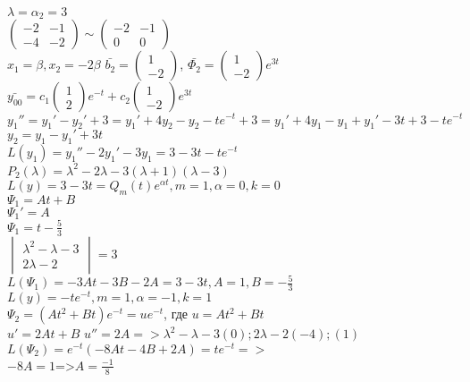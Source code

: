 \begin{Example}[алгебраическая]
$\lambda=\alpha_2=3$\\
    $\begin{pmatrix} -2 & -1\\ -4 & -2\end{pmatrix}\sim \begin{pmatrix} -2 & -1\\ 0 & 0\end{pmatrix}$\\
    $x_1=\beta, x_2=-2\beta$ $\bar{b_2}=\begin{pmatrix} 1\\ - 2\end{pmatrix}$, $\bar{\Phi_2}=\begin{pmatrix} 1\\  -2\end{pmatrix}e^{3t}$\\
$\bar{y_{00}}=c_1\begin{pmatrix} 1\\ 2\end{pmatrix}e^{-t}+c_2\begin{pmatrix} 1\\ - 2\end{pmatrix}e^{3t}$\\
$y_1''=y_1'-y_2'+3=y_1'+4y_2-y_2-te^{-t}+3=y_1'+4y_1-y_1+y_1'-3t+3-te^{-t}$\\
$y_2=y_1-y_1'+3t$\\
$L(y_1)=y_1''-2y_1'-3y_1=3-3t-te^{-t}$\\
$P_2(\lambda)=\lambda^2-2\lambda-3(\lambda+1)(\lambda-3)$\\
$L(y)=3-3t=Q_m(t)e^{\alpha t}, m=1,\alpha=0,k=0$\\
$\Psi_1=At+B$\\
$\Psi_1'=A$\\
$\Psi_1=t-\frac{5}{3}$\\
$\begin{vmatrix} \lambda^2-\lambda-3\\ 2\lambda-2\end{vmatrix}=3$\\
$L(\Psi_1)=-3At-3B-2A=3-3t, A=1, B=-\frac{5}{3}$\\
$L(y)=-te^{-t},m=1,\alpha=-1,k=1$\\
$\Psi_2=(At^2+Bt)e^{-t}=ue^{-t}$, где $u=At^2+Bt$\\
$u'=2At+B$ $u''=2A=>\lambda^2-\lambda-3(0);2\lambda-2(-4);(1)$\\
$L(\Psi_2)=e^{-t}(-8At-4B+2A)=te^{-t}=>$\\
$-8A=1$=>$A=\frac{-1}{8}$\\

\end{Example}
